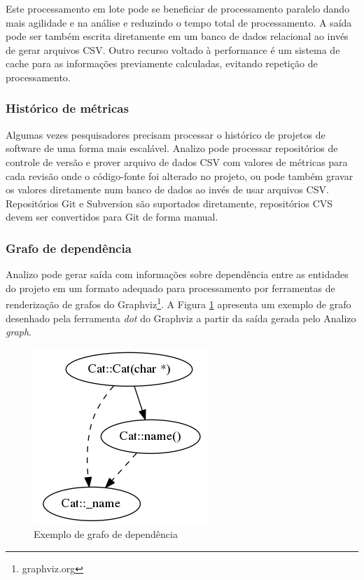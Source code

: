 Este processamento em lote pode se beneficiar de processamento paralelo dando
mais agilidade e na análise e reduzindo o tempo total de processamento.  A
saída pode ser também escrita diretamente em um banco de dados relacional ao
invés de gerar arquivos CSV. Outro recurso voltado à performance é um sistema
de cache para as informações previamente calculadas, evitando repetição de
processamento.

\subsubsection{Histórico de métricas}

Algumas vezes pesquisadores precisam processar o histórico de projetos de
software de uma forma mais escalável. Analizo pode processar repositórios de
controle de versão e prover arquivo de dados CSV com valores de métricas para
cada revisão onde o código-fonte foi alterado no projeto, ou pode também gravar
os valores diretamente num banco de dados ao invés de usar arquivos CSV. Repositórios Git e
Subversion são suportados diretamente, repositórios CVS devem ser convertidos
para Git de forma manual.

\subsubsection{Grafo de dependência}

Analizo pode gerar saída com informações sobre dependência entre as entidades
do projeto em um formato adequado para processamento por ferramentas de
renderização de grafos do Graphviz\footnote{graphviz.org}. A Figura
\ref{sample-graph} apresenta um exemplo de grafo desenhado pela ferramenta {\it
dot} do Graphviz a partir da saída gerada pelo Analizo {\it graph}.

\begin{figure}[h]
\center
\includegraphics[scale=0.4]{imagens/sample-graph.png}
\caption{Exemplo de grafo de dependência}
\label{sample-graph}
\end{figure}

